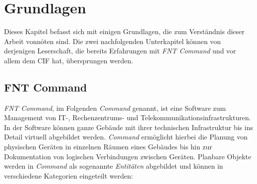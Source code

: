 
\chapter{Grundlagen}\label{ch:grundlagen}
Dieses Kapitel befasst sich mit einigen Grundlagen, die zum Verständnis dieser Arbeit vonnöten sind. Die zwei nachfolgenden Unterkapitel können von derjenigen Leserschaft, die bereits Erfahrungen mit \textit{FNT Command} und vor allem dem \ac{CIF} hat, übersprungen werden.

\section{FNT Command}\label{sec:command}
\textit{FNT Command}, im Folgenden \textit{Command} genannt, ist eine Software zum Management von IT-, Rechenzentrums- und Telekommunikationsinfrastrukturen. In der Software können ganze Gebäude mit ihrer technischen Infrastruktur bis ins Detail virtuell abgebildet werden. \textit{Command} ermöglicht hierbei die Planung von physischen Geräten in einzelnen Räumen eines Gebäudes bis hin zur Dokumentation von logischen Verbindungen zwischen Geräten. Planbare Objekte werden in \textit{Command} als sogenannte \textit{Entitäten} abgebildet und können in verschiedene Kategorien eingeteilt werden:

